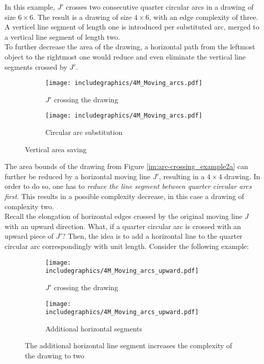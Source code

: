 In this example, $J'$ crosses two consecutive quarter circular arcs in a drawing of size $6\times6$. The result is a drawing of size $4\times6$, with an edge complexity of three. A verticel line segment of length one is introduced per substituted arc, merged to a vertical line segment of length two.\\
To further decrease the area of the drawing, a horizontal path from the leftmost object to the rightmost one would reduce and even eliminate the vertical line segments crossed by $J'$.
\begin{figure}[H]
	\centering
	\begin{subfigure}{0.4\linewidth}
		\centering
		\texttt{[image: includegraphics/4M\_Moving\_arcs.pdf]}
		\caption{$J'$ crossing the drawing}
	\end{subfigure}
	\begin{subfigure}{0.4\linewidth}
		\centering
		\texttt{[image: includegraphics/4M\_Moving\_arcs.pdf]}
		\caption{Circular arc substitution}
	\end{subfigure}
	\caption{Vertical area saving}\label{im:arc-crossing_example3}
\end{figure}
The area bounds of the drawing from Figure \ref{im:arc-crossing_example2a} can further be reduced by a horizontal moving line $J'$, resulting in a $4\times4$ drawing. In order to do so, one has to \textit{reduce the line segment between quarter circular arcs first}. This results in a possible complexity decrease, in this case a drawing of complexity two. \\
Recall the elongation of horizontal edges crossed by the original moving line $J$ with an upward direction. What, if a quarter circular arc is crossed with an upward piece of $J'$? Then, the idea is to add a horizontal line to the quarter circular arc correspondingly with unit length. Consider the following example:
\begin{figure}[H]
	\centering
		\begin{subfigure}{0.4\linewidth}
		\centering
		\texttt{[image: includegraphics/4M\_Moving\_arcs\_upward.pdf]}
		\caption{$J'$ crossing the drawing}
	\end{subfigure}
	\begin{subfigure}{0.4\linewidth}
		\centering
		\texttt{[image: includegraphics/4M\_Moving\_arcs\_upward.pdf]}
		\caption{Additional horizontal segments}
	\end{subfigure}
	\caption{The additional horizontal line segment increases the complexity of the drawing to two}
\end{figure}
